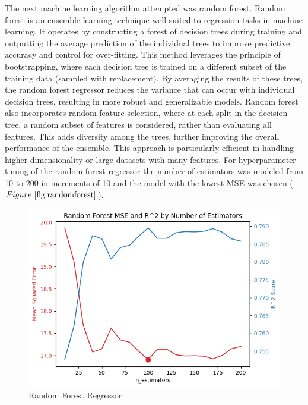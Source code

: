 \documentclass[conference, 11pt]{IEEEtran}
\begin{document}
The next machine learning algorithm attempted was random forest. Random forest is an ensemble learning technique well suited to regression tasks in machine learning. It operates by constructing a forest of decision trees during training and outputting the average prediction of the individual trees to improve predictive accuracy and control for over-fitting. This method leverages the principle of bootstrapping, where each decision tree is trained on a different subset of the training data (sampled with replacement). By averaging the results of these trees, the random forest regressor reduces the variance that can occur with individual decision trees, resulting in more robust and generalizable models. Random forest also incorporates random feature selection, where at each split in the decision tree, a random subset of features is considered, rather than evaluating all features. This adds diversity among the trees, further improving the overall performance of the ensemble. This approach is particularly efficient in handling higher dimensionality or large datasets with many features. For hyperparameter tuning of the random forest regressor the number of estimators was modeled from 10 to 200 in increments of 10 and the model with the lowest MSE was chosen ($Figure~\ref{fig:randomforest}$).

\begin{figure}
    \centering
    \includegraphics[width=1\linewidth]{Random Forest.png}
    \caption{Random Forest Regressor}
    \label{fig:randomforest}
\end{figure}
\end{document}
